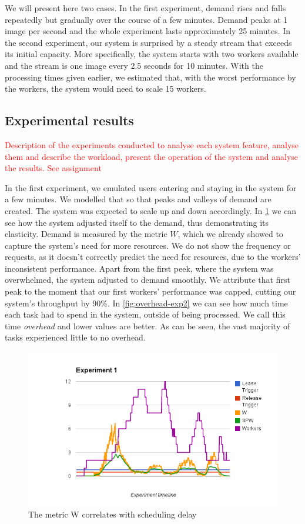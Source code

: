 \documentclass{stylesheet}
\begin{document}
We will present here two cases. In the first experiment, demand rises and falls repeatedly but gradually over the course of a few minutes. Demand peaks at 1 image per second and the whole experiment lasts approximately 25 minutes. In the second experiment, our system is surprised by a steady stream that exceeds its initial capacity. More specifically, the system starts with two workers available and the stream is one image every 2.5 seconds for 10 minutes. With the processing times given earlier, we estimated that, with the worst performance by the workers, the system would need to scale 15 workers. 

\subsection{Experimental results}
\label{subsec:results}
\textcolor{red}{Description of the experiments conducted to analyse each system feature, analyse them and describe the workload, present the operation of the system and analyse the results. See assignment}

In the first experiment, we emulated users entering and staying in the system for a few minutes. We modelled that so that peaks and valleys of demand are created. The system was expected to scale up and down accordingly. In \cref{fig:exp2-timeline} we can see how the system adjusted itself to the demand, thus demonstrating its elasticity. Demand is measured by the metric $W$, which we already showed to capture the system's need for more resources. We do not show the frequency or requests, as it doesn't correctly predict the need for resources, due to the workers' inconsistent performance. Apart from the first peek, where the system was overwhelmed, the system adjusted to demand smoothly. We attribute that first peak to the moment that our first workers' performance was capped, cutting our system's throughput by 90\%. In \cref{fig:overhead-exp2} we can see how much time each task had to spend in the system, outside of being processed. We call this time \textit{overhead} and lower values are better. As can be seen, the vast majority of tasks experienced little to no overhead.

\begin{figure}[b!]
	\centering
	\includegraphics[width=\linewidth]{exp2-timeline.png}
	\caption{The metric W correlates with scheduling delay}
	\label{fig:exp2-timeline}
\end{figure}
\end{document}
